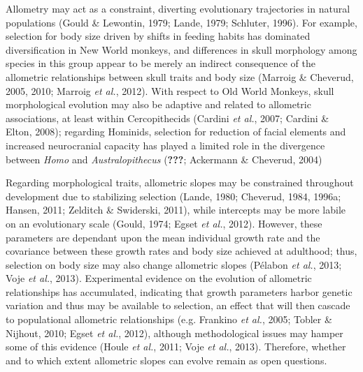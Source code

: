 \documentclass[12pt,twoside]{report}
\begin{document}
Allometry may act as a constraint, diverting evolutionary trajectories
in natural populations (Gould \& Lewontin, 1979; Lande, 1979; Schluter,
1996). For example, selection for body size driven by shifts in feeding
habits has dominated diversification in New World monkeys, and
differences in skull morphology among species in this group appear to be
merely an indirect consequence of the allometric relationships between
skull traits and body size (Marroig \& Cheverud, 2005, 2010; Marroig
\emph{et al.}, 2012). With respect to Old World Monkeys, skull
morphological evolution may also be adaptive and related to allometric
associations, at least within Cercopithecids (Cardini \emph{et al.},
2007; Cardini \& Elton, 2008); regarding Hominids, selection for
reduction of facial elements and increased neurocranial capacity has
played a limited role in the divergence between \emph{Homo} and
\emph{Australopithecus} ({\textbf{???}}; Ackermann \& Cheverud, 2004)

Regarding morphological traits, allometric slopes may be constrained
throughout development due to stabilizing selection (Lande, 1980;
Cheverud, 1984, 1996a; Hansen, 2011; Zelditch \& Swiderski, 2011), while
intercepts may be more labile on an evolutionary scale (Gould, 1974;
Egset \emph{et al.}, 2012). However, these parameters are dependant upon
the mean individual growth rate and the covariance between these growth
rates and body size achieved at adulthood; thus, selection on body size
may also change allometric slopes (Pélabon \emph{et al.}, 2013; Voje
\emph{et al.}, 2013). Experimental evidence on the evolution of
allometric relationships has accumulated, indicating that growth
parameters harbor genetic variation and thus may be available to
selection, an effect that will then cascade to populational allometric
relationships (e.g. Frankino \emph{et al.}, 2005; Tobler \& Nijhout,
2010; Egset \emph{et al.}, 2012), although methodological issues may
hamper some of this evidence (Houle \emph{et al.}, 2011; Voje \emph{et
al.}, 2013). Therefore, whether and to which extent allometric slopes
can evolve remain as open questions.
\end{document}
